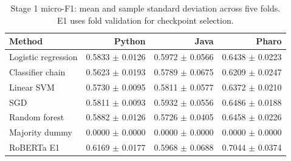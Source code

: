 \begin{table}[htbp]
\centering\small
\caption{Stage 1 micro-F1: mean and sample standard deviation across five folds. E1 uses fold validation for checkpoint selection.}\label{tab:mlcv}
\begin{tabular}{lrrr}\toprule
Method & Python & Java & Pharo\\\midrule
Logistic regression & 0.5833 $\pm$ 0.0126 & 0.5972 $\pm$ 0.0566 & 0.6438 $\pm$ 0.0223\\
Classifier chain & 0.5623 $\pm$ 0.0193 & 0.5789 $\pm$ 0.0675 & 0.6209 $\pm$ 0.0247\\
Linear SVM & 0.5730 $\pm$ 0.0095 & 0.5811 $\pm$ 0.0577 & 0.6372 $\pm$ 0.0210\\
SGD & 0.5811 $\pm$ 0.0093 & 0.5932 $\pm$ 0.0556 & 0.6486 $\pm$ 0.0188\\
Random forest & 0.5882 $\pm$ 0.0126 & 0.5726 $\pm$ 0.0405 & 0.6458 $\pm$ 0.0226\\
Majority dummy & 0.0000 $\pm$ 0.0000 & 0.0000 $\pm$ 0.0000 & 0.0000 $\pm$ 0.0000\\
RoBERTa E1 & 0.6169 $\pm$ 0.0177 & 0.5968 $\pm$ 0.0688 & 0.7044 $\pm$ 0.0374\\
\bottomrule\end{tabular}
\end{table}
